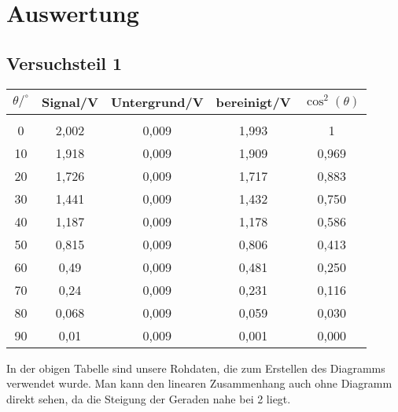 \section{Auswertung}

\subsection*{Versuchsteil 1}



\begin{center}
\begin{tabular}{c|c|c|c|c}
	$\theta/^\circ$ & Signal/V & Untergrund/V & bereinigt/V & $\cos^2(\theta)$ \\
	\hline
	&      &      &      &  \\
	0    & 2,002 & 0,009 & 1,993 & 1 \\
	10   & 1,918 & 0,009 & 1,909 & 0,969 \\
	20   & 1,726 & 0,009 & 1,717 & 0,883 \\
	30   & 1,441 & 0,009 & 1,432 & 0,750 \\
	40   & 1,187 & 0,009 & 1,178 & 0,586 \\
	50   & 0,815 & 0,009 & 0,806 & 0,413 \\
	60   & 0,49 & 0,009 & 0,481 & 0,250 \\
	70   & 0,24 & 0,009 & 0,231 & 0,116 \\
	80   & 0,068 & 0,009 & 0,059 & 0,030 \\
	90   & 0,01 & 0,009 & 0,001 & 0,000 \\
\end{tabular}	
\end{center}

In der obigen Tabelle sind unsere Rohdaten, die zum Erstellen des Diagramms verwendet wurde. Man kann den linearen Zusammenhang auch ohne Diagramm direkt sehen, da die Steigung der Geraden nahe bei 2 liegt.



\begin{figure}[H]
\end{figure}

